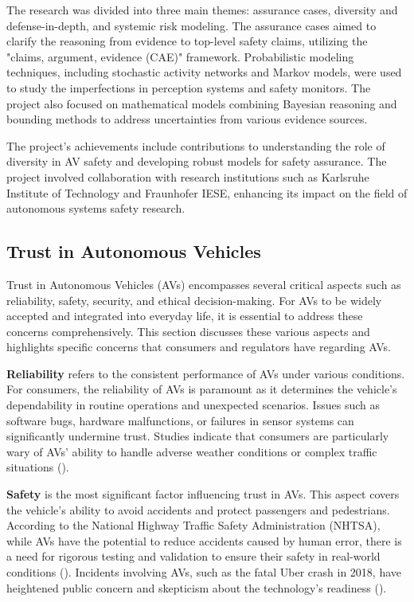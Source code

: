 The research was divided into three main themes: assurance cases, diversity and defense-in-depth, and systemic risk modeling. The assurance cases aimed to clarify the reasoning from evidence to top-level safety claims, utilizing the "claims, argument, evidence (CAE)" framework. Probabilistic modeling techniques, including stochastic activity networks and Markov models, were used to study the imperfections in perception systems and safety monitors. The project also focused on mathematical models combining Bayesian reasoning and bounding methods to address uncertainties from various evidence sources.

The project's achievements include contributions to understanding the role of diversity in AV safety and developing robust models for safety assurance. The project involved collaboration with research institutions such as Karlsruhe Institute of Technology and Fraunhofer IESE, enhancing its impact on the field of autonomous systems safety research.


\subsection{Trust in Autonomous Vehicles}

Trust in Autonomous Vehicles (AVs) encompasses several critical aspects such as reliability, safety, security, and ethical decision-making. For AVs to be widely accepted and integrated into everyday life, it is essential to address these concerns comprehensively. This section discusses these various aspects and highlights specific concerns that consumers and regulators have regarding AVs.

\textbf{Reliability} refers to the consistent performance of AVs under various conditions. For consumers, the reliability of AVs is paramount as it determines the vehicle's dependability in routine operations and unexpected scenarios. Issues such as software bugs, hardware malfunctions, or failures in sensor systems can significantly undermine trust. Studies indicate that consumers are particularly wary of AVs' ability to handle adverse weather conditions or complex traffic situations (\cite{gogoll2017}).

\textbf{Safety} is the most significant factor influencing trust in AVs. This aspect covers the vehicle's ability to avoid accidents and protect passengers and pedestrians. According to the National Highway Traffic Safety Administration (NHTSA), while AVs have the potential to reduce accidents caused by human error, there is a need for rigorous testing and validation to ensure their safety in real-world conditions (\cite{nhtsa2020}). Incidents involving AVs, such as the fatal Uber crash in 2018, have heightened public concern and skepticism about the technology’s readiness (\cite{goodall2016}).

